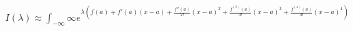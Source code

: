 \documentclass[preview]{standalone}
\begin{document}
\begin{align*}
I(\lambda) \approx \displaystyle \int_{-\infty}{\infty}e^{\lambda (f(a) + f'(a)(x - a) + \frac{f''(a)}{2!}(x - a)^2 + \frac{f^{(3)}(a)}{3!}(x - a)^3 + \frac{f^{(4)}(a)}{4!}(x - a)^4)}
\end{align*}
\end{document}
